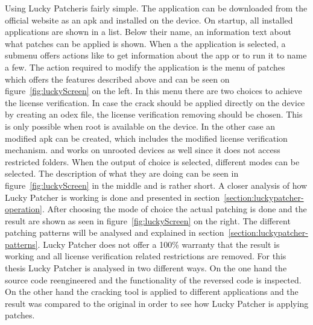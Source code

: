 Using Lucky Patcheris fairly simple.
The application can be downloaded from the official website \cite{luckyPatcherOfficial} as an \gls{apk} and installed on the device.
On startup, all installed applications are shown in a list.
Below their name, an information text about what patches can be applied is shown.
When a the application is selected, a submenu offers actions like to get information about the app or to run it to name a few.
The action required to modify the application is the menu of patches which offers the features described above and can be seen on figure~\ref{fig:luckyScreen} on the left.
In this menu there are two choices to achieve the license verification.
In case the crack should be applied directly on the device by creating an odex file, the license verification removing should be chosen.
This is only possible when root is available on the device.
In the other case an modified \gls{apk} can be created, which includes the modified license verification mechanism. and works on unrooted devices as well since it does not access restricted folders.
When the output of choice is selected, different modes can be selected.
The description of what they are doing can be seen in figure~\ref{fig:luckyScreen} in the middle and is rather short.
A closer analysis of how Lucky Patcher is working is done and presented in section~\ref{section:luckypatcher-operation}.
After choosing the mode of choice the actual patching is done and the result are shown as seen in figure~\ref{fig:luckyScreen} on the right.
The different patching patterns will be analysed and explained in section~\ref{section:luckypatcher-patterns}.
Lucky Patcher does not offer a 100\% warranty that the result is working and all license verification related restrictions are removed.
\newline
For this thesis Lucky Patcher is analysed in two different ways.
On the one hand the source code reengineered and the functionality of the reversed code is inspected.
On the other hand the cracking tool is applied to different applications and the result was compared to the original in order to see how Lucky Patcher is applying patches.



